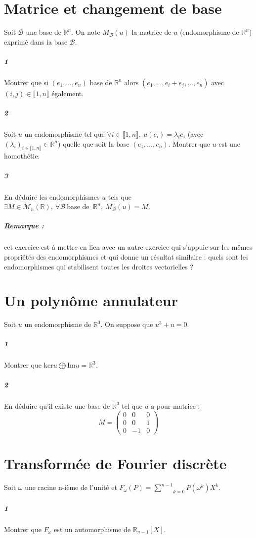 \documentclass[10pt,a4paper]{article}
\begin{document}
\section{Matrice et changement de base}
Soit $\mathcal{B}$ une base de $\mathbb{R}^n$. On note $M_{\mathcal{B}}(u)$ la matrice de $u$ (endomorphisme de $\mathbb{R}^n$) exprimé dans la base $\mathcal{B}$. 
\subparagraph{1}Montrer que si $(e_1,\dots,e_n)$ base de $\mathbb{R}^n$ alors $(e_1,\dots,e_i+e_j,\dots,e_n)$ avec $(i,j) \in \llbracket 1,n \rrbracket$ également.
\subparagraph{2}Soit $u$ un endomorphisme tel que $\forall i \in \llbracket 1,n \rrbracket, \ u(e_i) = \lambda_i e_i$ (avec $(\lambda_i)_{i \in \llbracket 1,n \rrbracket} \in \mathbb{R}^n$) quelle que soit la base $(e_1,\dots,e_n)$. Montrer que $u$ est une homothétie.
\subparagraph{3}En déduire les endomorphismes $u$ tels que $\exists M \in \mathcal{M}_n \left( \mathbb{R} \right), \ \forall \mathcal{B} \ \text{base de } \ \mathbb{R}^n, \ M_{\mathcal{B}}(u) = M$.

\subparagraph{Remarque :} cet exercice est à mettre en lien avec un autre exercice qui s'appuie sur les mêmes propriétés des endomorphismes et qui donne un résultat similaire : quels sont les endomorphismes qui stabilisent toutes les droites vectorielles ?


\section{Un polynôme annulateur}
Soit $u$ un endomorphisme de $\mathbb{R}^3$. On suppose que $u^3+u=0$.
\subparagraph{1}Montrer que $\text{ker}u \bigoplus \text{Im}u = \mathbb{R}^3$.
\subparagraph{2}En déduire qu'il existe une base de $\mathbb{R}^3$ tel que $u$ a pour matrice :
\[
M = \left( \begin{matrix}
0 & 0 & 0 \\ 0 & 0 & 1 \\ 0 & -1 & 0 
\end{matrix}\right)
\]

\section{Transformée de Fourier discrète}
Soit $\omega$ une racine n-ième de l'unité et $F_{\omega}(P) = \underset{k=0}{\overset{n-1}{\sum}}P(\omega^k)X^k$.
\subparagraph{1}Montrer que $F_{\omega}$ est un automorphisme de $\mathbb{R}_{n-1}[X]$.
\end{document}
